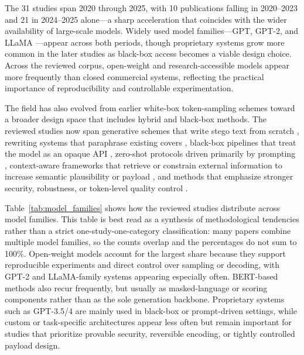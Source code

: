 The 31 studies span 2020 through 2025, with 10 publications falling in 2020--2023 and 21 in 2024--2025 alone---a sharp acceleration that coincides with the wider availability of large-scale models. Widely used model families---GPT, GPT-2, and LLaMA \cite{brown2020language,radford2019language,touvron2023llama2}---appear across both periods, though proprietary systems grow more common in the later studies as black-box access becomes a viable design choice. Across the reviewed corpus, open-weight and research-accessible models appear more frequently than closed commercial systems, reflecting the practical importance of reproducibility and controllable experimentation.

The field has also evolved from earlier white-box token-sampling schemes toward a broader design space that includes hybrid and black-box methods. The reviewed studies now span generative schemes that write stego text from scratch \cite{yang2020vae,zhang2021provably,ding2023discop,kaptchuk2021meteor}, rewriting systems that paraphrase existing covers \cite{li2023rewriting}, black-box pipelines that treat the model as an opaque API \cite{wu2024generative,steinebach2024natural,kuznetsov2025deepstego,wozniak2025multicriteria}, zero-shot protocols driven primarily by prompting \cite{lin2024zero}, context-aware frameworks that retrieve or constrain external information to increase semantic plausibility or payload \cite{liao2024co,wang2023hi,shi2025emotionally}, and methods that emphasize stronger security, robustness, or token-level quality control \cite{kaptchuk2021meteor,ding2023discop,lin2025positionagnostic,chen2025activetwo}.

Table~\ref{tab:model_families} shows how the reviewed studies distribute across model families. This table is best read as a synthesis of methodological tendencies rather than a strict one-study-one-category classification: many papers combine multiple model families, so the counts overlap and the percentages do not sum to 100\%. Open-weight models account for the largest share because they support reproducible experiments and direct control over sampling or decoding, with GPT-2 and LLaMA-family systems appearing especially often. BERT-based methods also recur frequently, but usually as masked-language or scoring components rather than as the sole generation backbone. Proprietary systems such as GPT-3.5/4 are mainly used in black-box or prompt-driven settings, while custom or task-specific architectures appear less often but remain important for studies that prioritize provable security, reversible encoding, or tightly controlled payload design.

